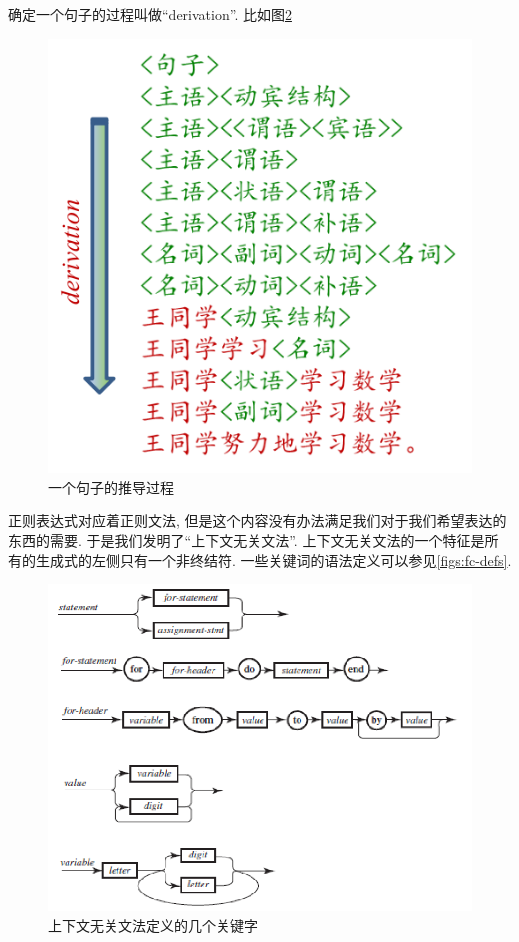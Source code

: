 确定一个句子的过程叫做``derivation''. 比如图\ref{figs:divs}

\begin{figure}[h!]
	\centering
	\includegraphics[scale=0.8]{4-programs/figs/der}
	\caption{一个句子的推导过程}
	\label{figs:divs}
	
\end{figure}


正则表达式对应着正则文法, 但是这个内容没有办法满足我们对于我们希望表达的东西的需要. 于是我们发明了``上下文无关文法''. 上下文无关文法的一个特征是所有的生成式的左侧只有一个非终结符. 一些关键词的语法定义可以参见\ref{figs:fc-defs}. 

\begin{figure}[h!]
	\centering
	\includegraphics[scale=0.8]{4-programs/figs/example-defs.png}
	\caption{上下文无关文法定义的几个关键字}
	\label{figs:divs}
	
\end{figure}

